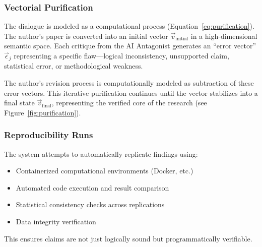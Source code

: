 \documentclass[11pt,a4paper]{article}
\begin{document}
\subsubsection{Vectorial Purification}
The dialogue is modeled as a computational process (Equation~\eqref{eq:purification}). The author's paper is converted into an initial vector $\vec{v}_{\text{initial}}$ in a high-dimensional semantic space. Each critique from the AI Antagonist generates an ``error vector'' $\vec{\epsilon}_j$ representing a specific flaw—logical inconsistency, unsupported claim, statistical error, or methodological weakness.

The author's revision process is computationally modeled as subtraction of these error vectors. This iterative purification continues until the vector stabilizes into a final state $\vec{v}_{\text{final}}$, representing the verified core of the research (see Figure~\ref{fig:purification}).

\subsubsection{Reproducibility Runs}
The system attempts to automatically replicate findings using:
\begin{itemize}[nosep]
    \item Containerized computational environments (Docker, etc.)
    \item Automated code execution and result comparison
    \item Statistical consistency checks across replications
    \item Data integrity verification
\end{itemize}

\noindent This ensures claims are not just logically sound but programmatically verifiable.
\end{document}
